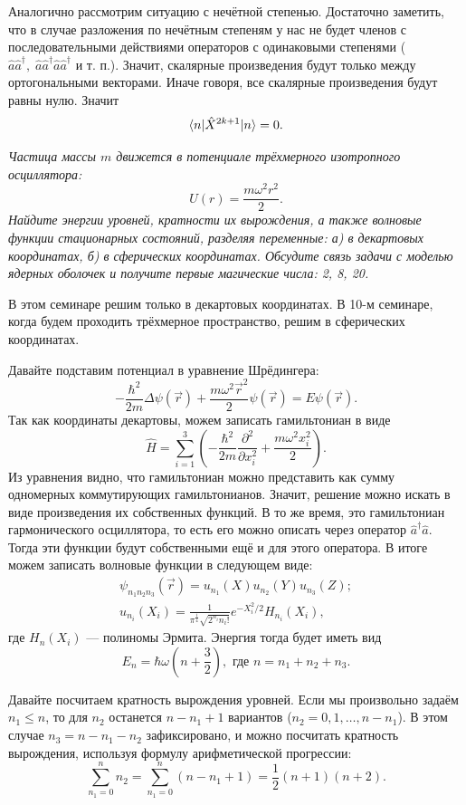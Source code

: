 Аналогично рассмотрим ситуацию с нечётной степенью. Достаточно заметить, что в
случае разложения по нечётным степеням у нас не будет членов с
последовательными действиями операторов с одинаковыми степенями ($\hat a\hat
  a^{\dagger},\; \hat a\hat a^{\dagger}\hat a\hat a^{\dagger}$ и т. п.). Значит,
скалярные произведения будут только между ортогональными векторами. Иначе
говоря, все скалярные произведения будут равны нулю. Значит
\[
  \langle n\rvert\hat X^{2k+1}\lvert n\rangle = 0.
\]
\qedsq
\begin{exercise}
  \textit{Частица массы $m$ движется в потенциале трёхмерного изотропного
    осциллятора:}
  \[
    U(r) = \frac{m\omega^2r^2}{2}.
  \]
  \textit{Найдите энергии уровней, кратности их вырождения, а также волновые
    функции стационарных состояний, разделяя переменные: а) в декартовых
    координатах, б) в сферических координатах. Обсудите связь задачи с моделью
    ядерных оболочек и получите первые магические числа: 2, 8, 20.}
\end{exercise}

В этом семинаре решим только в декартовых координатах. В 10-м семинаре, когда
будем проходить трёхмерное пространство, решим в сферических координатах.

Давайте подставим потенциал в уравнение Шрёдингера:
\[
  -\frac{\hbar^2}{2m}\Delta\psi(\Vec{r}) + \frac{m\omega^2\Vec{r}^2}{2}\psi(\Vec{r}) = E\psi(\Vec{r}).
\]
Так как координаты декартовы, можем записать гамильтониан в виде
\[
  \hat H = \sum\limits_{i=1}^3(-\frac{\hbar^2}{2m}\frac{\partial^2}{\partial x_i^2} + \frac{m\omega^2x_i^2}{2}).
\]
Из уравнения видно, что гамильтониан можно представить как сумму одномерных
коммутирующих гамильтонианов. Значит, решение можно искать в виде произведения
их собственных функций. В то же время, это гамильтониан гармонического
осциллятора, то есть его можно описать через оператор
$\hat{a}^{\dagger}\hat{a}$. Тогда эти функции будут собственными ещё и для
этого оператора. В итоге можем записать волновые функции в следующем виде:
\begin{gather*}
  \psi_{n_1n_2n_3}(\Vec{r}) = u_{n_1}(X)u_{n_2}(Y)u_{n_3}(Z);\\
  u_{n_i}(X_i) = \frac{1}{\pi^{\frac{1}{4}}\sqrt{2^{n_i}n_i!}}e^{-X_i^2/2}H_{n_i}(X_i),
\end{gather*}
где $H_{n}(X_i)$ --- полиномы Эрмита. Энергия тогда будет иметь вид
\[
  E_n = \hbar\omega(n+\frac{3}{2}), \text{ где } n = n_1 + n_2 + n_3.
\]

Давайте посчитаем кратность вырождения уровней. Если мы произвольно задаём $n_1
  \leq n$, то для $n_2$ останется $n-n_1+1$ вариантов ($n_2 = 0, 1, \dots, n -
  n_1$). В этом случае $n_3 = n - n_1 - n_2$ зафиксировано, и можно посчитать
кратность вырождения, используя формулу арифметической прогрессии:
\[
  \sum\limits_{n_1 = 0}^n n_2 = \sum\limits_{n_1 = 0}^n (n-n_1 + 1) = \frac{1}{2}(n+1)(n+2).
\]

